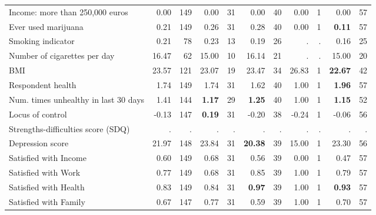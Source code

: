 \begin{tabular}{l r r r r r r r r r r}
Income: more than 250,000 euros &      0.00 &       149 &      0.00 &        31 &      0.00 &        40 &      0.00 &         1 &      0.00 &        57 \\
Ever used marijuana &      0.21 &       149 &      0.26 &        31 &      0.28 &        40 &      0.00 &         1 & \textbf{     0.11} &        57 \\
Smoking indicator &      0.21 &        78 &      0.23 &        13 &      0.19 &        26 &         . & . &      0.16 &        25 \\
Number of cigarettes per day &     16.47 &        62 &     15.00 &        10 &     16.14 &        21 &         . & . &     15.00 &        20 \\
BMI &     23.57 &       121 &     23.07 &        19 &     23.47 &        34 &     26.83 &         1 & \textbf{    22.67} &        42 \\
Respondent health &      1.74 &       149 &      1.74 &        31 &      1.62 &        40 &      1.00 &         1 & \textbf{     1.96} &        57 \\
Num. times unhealthy in last 30 days &      1.41 &       144 & \textbf{     1.17} &        29 & \textbf{     1.25} &        40 &      1.00 &         1 & \textbf{     1.15} &        52 \\
Locus of control &     -0.13 &       147 & \textbf{     0.19} &        31 &     -0.20 &        38 &     -0.24 &         1 &     -0.06 &        56 \\
Strengths-difficulties score (SDQ) &         . & . &         . & . &         . & . &         . & . &         . & . \\
Depression score &     21.97 &       148 &     23.84 &        31 & \textbf{    20.38} &        39 &     15.00 &         1 &     23.30 &        56 \\
Satisfied with Income &      0.60 &       149 &      0.68 &        31 &      0.56 &        39 &      0.00 &         1 &      0.47 &        57 \\
Satisfied with Work &      0.77 &       149 &      0.68 &        31 &      0.85 &        39 &      1.00 &         1 &      0.79 &        57 \\
Satisfied with Health &      0.83 &       149 &      0.84 &        31 & \textbf{     0.97} &        39 &      1.00 &         1 & \textbf{     0.93} &        57 \\
Satisfied with Family &      0.67 &       147 &      0.77 &        31 &      0.59 &        39 &      1.00 &         1 &      0.70 &        57 \\
\bottomrule
\end{tabular}
